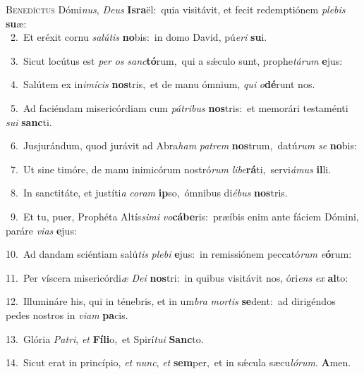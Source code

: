 \lettrine{\initial\textcolor{\initialcolor}{B}}{enedíctus} Dómi\-\textit{nus}\-, \textit{De}\-\textit{us} \textbf{Is}\-\textbf{ra}ël:~\star quia visitávit, et fecit redemptiónem \textit{ple}\-\textit{bis} \textbf{su}\-æ:\\
{\numbfont\textcolor{\numbcolor}{~2.}}~Et eréxit cornu \textit{sa}\-\textit{lú}\textit{tis} \textbf{no}\-bis:~\star in domo David, pú\-\textit{e}\-\textit{ri} \textbf{su}\-i.\par
{\numbfont\textcolor{\numbcolor}{~3.}}~Sicut locútus est \textit{per} \textit{os} \textit{sanc}\-\textbf{tó}rum,~\star qui a sǽculo sunt, prophe\-\textit{tá}\-\textit{rum} \textbf{e}\-jus:\par
{\numbfont\textcolor{\numbcolor}{~4.}}~Salútem ex in\-\textit{i}\-\textit{mí}\textit{cis} \textbf{nos}\-tris,~\star et de manu ómnium, \textit{qui} \textit{o}\-\textbf{dé}runt nos.\par
{\numbfont\textcolor{\numbcolor}{~5.}}~Ad faciéndam misericórdiam cum \textit{pá}\-\textit{tri}\textit{bus} \textbf{nos}\-tris:~\star et memorári testaménti \textit{su}\-\textit{i} \textbf{sanc}\-ti.\par
{\numbfont\textcolor{\numbcolor}{~6.}}~Jusjurándum, quod jurávit ad Abra\textit{ham} \textit{pa}\-\textit{trem} \textbf{nos}\-trum,~\star datú\textit{rum} \textit{se} \textbf{no}\-bis:\par
{\numbfont\textcolor{\numbcolor}{~7.}}~Ut sine timóre, de manu inimicórum nostró\textit{rum} \textit{li}\-\textit{be}\textbf{rá}ti,~\star servi\-\textit{á}\-\textit{mus} \textbf{il}\-li.\par
{\numbfont\textcolor{\numbcolor}{~8.}}~In sanctitáte, et justíti\textit{a} \textit{co}\-\textit{ram} \textbf{ip}\-so,~\star ómnibus di\-\textit{é}\-\textit{bus} \textbf{nos}\-tris.\par
{\numbfont\textcolor{\numbcolor}{~9.}}~Et tu, puer, Prophéta Altís\-\textit{si}\-\textit{mi} \textit{vo}\-\textbf{cá}\textbf{be}ris:~\star præíbis enim ante fáciem Dómini, paráre \textit{vi}\-\textit{as} \textbf{e}\-jus:\par
{\numbfont\textcolor{\numbcolor}{10.}}~Ad dandam sciéntiam salú\textit{tis} \textit{ple}\-\textit{bi} \textbf{e}\-jus:~\star in remissiónem peccató\textit{rum} \textit{e}\-\textbf{ó}rum:\par
{\numbfont\textcolor{\numbcolor}{11.}}~Per víscera misericórdi\textit{æ} \textit{De}\-\textit{i} \textbf{nos}\-tri:~\star in quibus visitávit nos, óri\textit{ens} \textit{ex} \textbf{al}\-to:\par
{\numbfont\textcolor{\numbcolor}{12.}}~Illumináre his, qui in ténebris, et in um\textit{bra} \textit{mor}\-\textit{tis} \textbf{se}\-dent:~\star ad dirigéndos pedes nostros in \textit{vi}\-\textit{am} \textbf{pa}\-cis.\par
{\numbfont\textcolor{\numbcolor}{13.}}~Glória \textit{Pa}\-\textit{tri}, \textit{et} \textbf{Fí}\-\textbf{li}o,~\star et Spirí\-\textit{tu}\-\textit{i} \textbf{Sanc}\-to.\par
{\numbfont\textcolor{\numbcolor}{14.}}~Sicut erat in princípio, \textit{et} \textit{nunc}\-, \textit{et} \textbf{sem}\-per,~\star et in sǽcula sæcu\-\textit{ló}\-\textit{rum}. \textbf{A}\-men.\par
